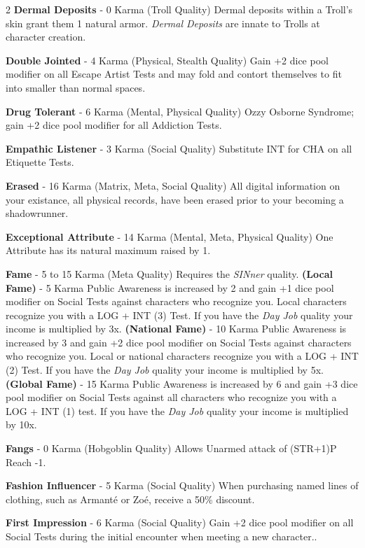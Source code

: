 \documentclass[
  oneside]{article}
\begin{document}
\begin{multicols}{2}
\textbf{Dermal Deposits} - 0 Karma (Troll Quality)
Dermal deposits within a Troll's skin grant them 1
natural armor. \emph{Dermal Deposits} are innate
to Trolls at character creation.

\textbf{Double Jointed} - 4 Karma (Physical,
Stealth Quality) Gain +2 dice pool modifier on all
Escape Artist Tests and may fold and contort
themselves to fit into smaller than normal spaces.

\textbf{Drug Tolerant} - 6 Karma (Mental, Physical
Quality) Ozzy Osborne Syndrome; gain +2 dice pool
modifier for all Addiction Tests.

\textbf{Empathic Listener} - 3 Karma (Social
Quality) Substitute INT for CHA on all Etiquette
Tests.

\textbf{Erased} - 16 Karma (Matrix, Meta, Social
Quality) All digital information on your
existance, all physical records, have been erased
prior to your becoming a shadowrunner.

\textbf{Exceptional Attribute} - 14 Karma (Mental,
Meta, Physical Quality) One Attribute has its
natural maximum raised by 1.

\textbf{Fame} - 5 to 15 Karma (Meta Quality)
Requires the \emph{SINner} quality. \textbf{(Local
Fame)} - 5 Karma Public Awareness is increased by
2 and gain +1 dice pool modifier on Social Tests
against characters who recognize you. Local
characters recognize you with a LOG + INT (3)
Test. If you have the \emph{Day Job} quality your
income is multiplied by 3x. \textbf{(National
Fame)} - 10 Karma Public Awareness is increased by
3 and gain +2 dice pool modifier on Social Tests
against characters who recognize you. Local or
national characters recognize you with a LOG + INT
(2) Test. If you have the \emph{Day Job} quality
your income is multiplied by 5x. \textbf{(Global
Fame)} - 15 Karma Public Awareness is increased by
6 and gain +3 dice pool modifier on Social Tests
against all characters who recognize you with a
LOG + INT (1) test. If you have the \emph{Day Job}
quality your income is multiplied by 10x.

\textbf{Fangs} - 0 Karma (Hobgoblin Quality)
Allows Unarmed attack of (STR+1)P Reach -1.

\textbf{Fashion Influencer} - 5 Karma (Social
Quality) When purchasing named lines of clothing,
such as Armanté or Zoé, receive a 50\% discount.

\textbf{First Impression} - 6 Karma (Social
Quality) Gain +2 dice pool modifier on all Social
Tests during the initial encounter when meeting a
new character..


\end{multicols}
\end{document}
